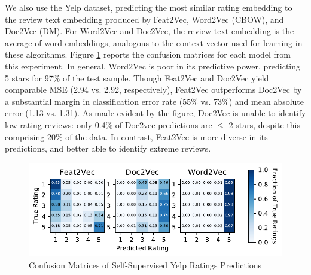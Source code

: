 \documentclass{article}
\begin{document}
We also use the Yelp dataset, predicting the most similar rating embedding to the review text embedding produced by Feat2Vec, Word2Vec (CBOW), and Doc2Vec (DM).
For Word2Vec and Doc2Vec, the review text embedding is the average of word embeddings, analogous to the context vector used for learning in these algorithms. Figure \ref{fig:confmat} reports the confusion matrices for each model from this experiment.
In general, Word2Vec is poor in its predictive power, predicting 5 stars for 97\% of the test sample.
Though Feat2Vec and Doc2Vec yield comparable MSE (2.94 vs. 2.92, respectively), Feat2Vec outperforms Doc2Vec by a substantial margin in classification error rate (55\% vs. 73\%) and mean absolute error (1.13 vs. 1.31).
As made evident by the figure, Doc2Vec is unable to identify low rating reviews: only 0.4\% of Doc2vec predictions are $\leq$ 2 stars, despite this comprising 20\% of the data. In contrast, Feat2Vec is more diverse in its predictions, and better able to identify extreme reviews.

\begin{figure}
\includegraphics[width=.5\textwidth]{../paper/output/yelp/text_rating_confusionmat_numbers}
\caption{Confusion Matrices of Self-Supervised Yelp Ratings Predictions}
\label{fig:confmat}
\end{figure}
\end{document}
